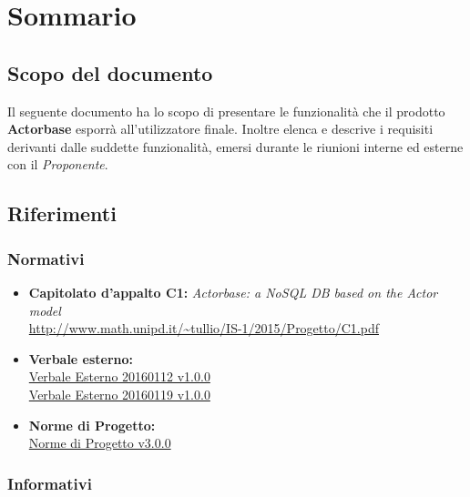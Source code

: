 \documentclass{scalatekids-article}
\begin{document}
\section{Sommario}

\subsection{Scopo del documento}

Il seguente documento ha lo scopo di presentare le funzionalità che il prodotto
\textbf{Actorbase} esporrà all'utilizzatore finale. Inoltre elenca e descrive i
requisiti derivanti dalle suddette funzionalità, emersi durante le riunioni
interne ed esterne con il \textit{Proponente}.
\prodPurpose{}\glossExpl{}

\subsection{Riferimenti}

\subsubsection{Normativi}

\begin{itemize}
\item\textbf{Capitolato d'appalto C1:} \textit{Actorbase: a NoSQL DB based on the Actor model}\\
  \url{http://www.math.unipd.it/~tullio/IS-1/2015/Progetto/C1.pdf}
\item\textbf{Verbale esterno:}\\
  \href{run:../RR/Interni/VerbaleEsterno20160112\_v1.0.0.pdf}{Verbale Esterno 20160112 v1.0.0}\\
  \href{run:../RR/Interni/VerbaleEsterno20160119\_v1.0.0.pdf}{Verbale Esterno 20160119 v1.0.0}
\item\textbf{Norme di Progetto:}\\
  \href{run:../Interni/NormeDiProgetto\_v3.0.0.pdf}{Norme di Progetto v3.0.0}
\end{itemize}

\subsubsection{Informativi}
\end{document}
